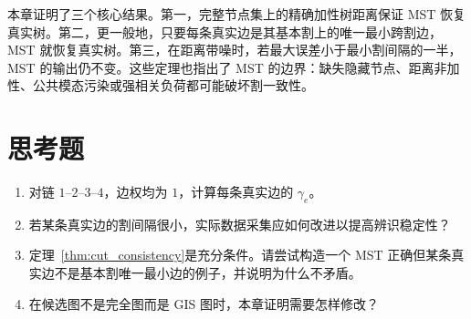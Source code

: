 本章证明了三个核心结果。第一，完整节点集上的精确加性树距离保证 MST 恢复真实树。第二，更一般地，只要每条真实边是其基本割上的唯一最小跨割边，MST 就恢复真实树。第三，在距离带噪时，若最大误差小于最小割间隔的一半，MST 的输出仍不变。这些定理也指出了 MST 的边界：缺失隐藏节点、距离非加性、公共模态污染或强相关负荷都可能破坏割一致性。

\section*{思考题}
\begin{enumerate}
  \item 对链 $1$--$2$--$3$--$4$，边权均为 $1$，计算每条真实边的 $\gamma_e$。
  \item 若某条真实边的割间隔很小，实际数据采集应如何改进以提高辨识稳定性？
  \item 定理~\ref{thm:cut_consistency}是充分条件。请尝试构造一个 MST 正确但某条真实边不是基本割唯一最小边的例子，并说明为什么不矛盾。
  \item 在候选图不是完全图而是 GIS 图时，本章证明需要怎样修改？
\end{enumerate}
